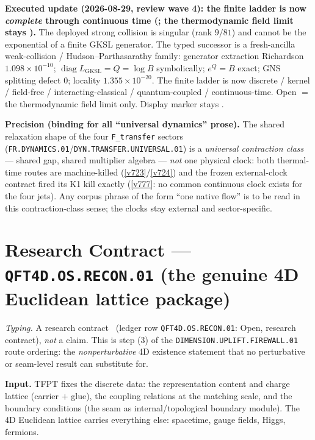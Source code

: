 \documentclass[11pt,a4paper]{article}
\begin{document}
\par\smallskip\noindent\textbf{Executed update (2026-08-29, review wave 4): the finite ladder
is now \emph{complete} through continuous time
(; the thermodynamic
field limit stays \mO).}
The deployed strong collision is singular (rank $9/81$) and cannot be the exponential of a
finite GKSL generator.  The typed successor is a fresh-ancilla weak-collision /
Hudson--Parthasarathy family: generator extraction Richardson $1.098\times10^{-10}$;
$\operatorname{diag}L_{\mathrm{GKSL}}=Q=\log B$ symbolically; $e^{Q}=B$ exact; GNS splitting
defect $0$; locality $1.355\times10^{-20}$.  The finite ladder is now
discrete / kernel / field-free / interacting-classical / quantum-coupled / continuous-time.
Open $=$ the thermodynamic field limit only.  Display marker stays \mO.

\par\smallskip\noindent\textbf{Precision (binding for all ``universal dynamics'' prose).}  The
shared relaxation shape of the four \texttt{F\_transfer} sectors
(\texttt{FR.DYNAMICS.01}/\texttt{DYN.TRANSFER.UNIVERSAL.01}) is a \emph{universal contraction
class} --- shared gap, shared multiplier algebra --- \emph{not} one physical clock: both
thermal-time routes are machine-killed (\vref{v723}/\vref{v724}) and the frozen external-clock
contract fired its K1 kill exactly (\vref{v777}: no common continuous clock exists for the four
jets).  Any corpus phrase of the form ``one native flow'' is to be read in this contraction-class
sense; the clocks stay external and sector-specific.

\section*{Research Contract --- \texttt{QFT4D.OS.RECON.01} (the genuine 4D Euclidean lattice package)}
\noindent\emph{Typing.} A research contract \mO\ (ledger row \texttt{QFT4D.OS.RECON.01}: Open,
research contract), \emph{not} a claim.  This is step (3) of the
\texttt{DIMENSION.UPLIFT.FIREWALL.01} route ordering: the \emph{nonperturbative} 4D existence
statement that no perturbative or seam-level result can substitute for.

\par\smallskip\noindent\textbf{Input.}  TFPT fixes the discrete data: the representation content
and charge lattice (carrier $+$ glue), the coupling relations at the matching scale, and the
boundary conditions (the seam as internal/topological boundary module).  The 4D Euclidean
lattice carries everything else: spacetime, gauge fields, Higgs, fermions.
\end{document}
